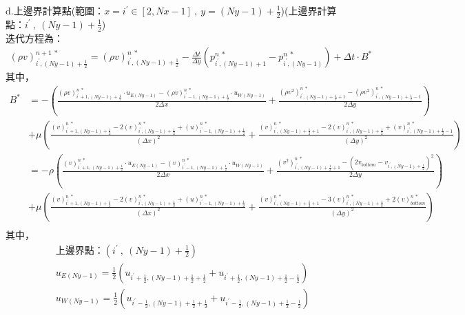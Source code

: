 \documentclass[12pt]{article}
\begin{document}
\noindent d.上邊界計算點(範圍：$x = i^{\prime} \in [2,Nx-1]\ ,\  y = (Ny-1)+\frac{1}{2}$)(上邊界計算點：$i^{\prime}\ ,\ (Ny-1)+\frac{1}{2}$)\\[1.5ex]
\noindent 迭代方程為：
\begin{equation}\begin{split}
    (\rho v)_{i^{\prime},(Ny-1)+\frac{1}{2}}^{n+1\ *} = (\rho v)_{i^{\prime},(Ny-1)+\frac{1}{2}}^{n\ *} - \frac{\Delta t}{\Delta y}(p_{i^{\prime},(Ny-1)+1}^{n\ *} - p_{i^{\prime},(Ny-1)}^{n\ *}) + \Delta t\cdot B^{*}
\end{split}\end{equation}
\noindent 其中，
{\footnotesize
\begin{equation*}\begin{split}
    B^{*} 
    &= -\left(\frac{(\rho v)_{i^{\prime}+1,(Ny-1)+\frac{1}{2}}^{n\ *}\cdot u_{E(Ny-1)} - (\rho v)_{i^{\prime}-1,(Ny-1)+\frac{1}{2}}^{n\ *}\cdot u_{W(Ny-1)}}{2\Delta x} + \frac{(\rho v^{2})_{i^{\prime},(Ny-1)+\frac{1}{2}+1}^{n\ *}- (\rho v^{2})_{i^{\prime},(Ny-1)+\frac{1}{2}-1}^{n\ *}}{2\Delta y}\right)\\[1.5ex]
    &+\mu\left(\frac{(v)_{i^{\prime}+1,(Ny-1)+\frac{1}{2}}^{n\ *}-2(v)_{i^{\prime},(Ny-1)+\frac{1}{2}}^{n\ *}+(u)_{i^{\prime}-1,(Ny-1)+\frac{1}{2}}^{n\ *}}{(\Delta x)^{2}}+\frac{(v)_{i^{\prime},(Ny-1)+\frac{1}{2}+1}^{n\ *}-2(v)_{i^{\prime},(Ny-1)+\frac{1}{2}}^{n\ *}+(v)_{i^{\prime},(Ny-1)+\frac{1}{2}-1}^{n\ *}}{(\Delta y)^{2}}\right)\\[1.5ex]
    &= -\rho \left(\frac{(v)_{i^{\prime}+1,(Ny-1)+\frac{1}{2}}^{n\ *}\cdot u_{E(Ny-1)} - (v)_{i^{\prime}-1,(Ny-1)+\frac{1}{2}}^{n\ *}\cdot u_{W(Ny-1)}}{2\Delta x} + \frac{(v^{2})_{i^{\prime},(Ny-1)+\frac{1}{2}+1}^{n\ *}- (2v_{bottom} - v_{i^{\prime},(Ny-1)+\frac{1}{2}})^{2}}{2\Delta y}\right)\\[1.5ex]
    &+\mu\left(\frac{(v)_{i^{\prime}+1,(Ny-1)+\frac{1}{2}}^{n\ *}-2(v)_{i^{\prime},(Ny-1)+\frac{1}{2}}^{n\ *}+(u)_{i^{\prime}-1,(Ny-1)+\frac{1}{2}}^{n\ *}}{(\Delta x)^{2}}+\frac{(v)_{i^{\prime},(Ny-1)+\frac{1}{2}+1}^{n\ *}-3(v)_{i^{\prime},(Ny-1)+\frac{1}{2}}^{n\ *}+2(v)_{bottom}^{n\ *}}{(\Delta y)^{2}}\right)\\[1.5ex]
\end{split}\end{equation*}
}
\noindent 其中，
\begin{equation*}\begin{split}
    &\text{上邊界點：}(i^{\prime}\ ,\ (Ny-1)+\frac{1}{2})\\[1.5ex]
    &u_{E(Ny-1)} = \frac{1}{2}(u_{i^{\prime}+\frac{1}{2}, (Ny-1)+\frac{1}{2}+\frac{1}{2}} + u_{i^{\prime}+\frac{1}{2}, (Ny-1)+\frac{1}{2}-\frac{1}{2}})\\[1.5ex]
    &u_{W(Ny-1)} = \frac{1}{2}(u_{i^{\prime}-\frac{1}{2}, (Ny-1)+\frac{1}{2}+\frac{1}{2}} + u_{i^{\prime}-\frac{1}{2}, (Ny-1)+\frac{1}{2}-\frac{1}{2}})\\[1.5ex]
\end{split}\end{equation*}
\end{document}
